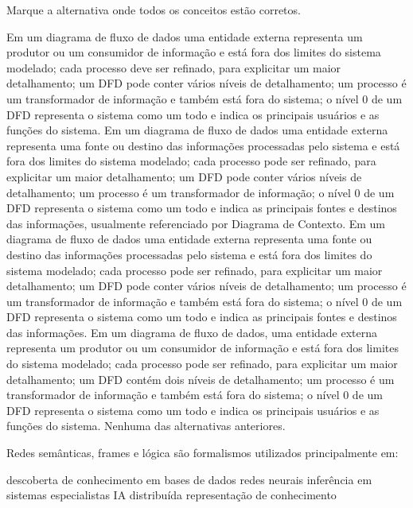\documentclass[12pt, addpoints]{exam}
\begin{document}
    \begin{questions}

    \newpage
    \question
Marque a alternativa onde todos os conceitos estão corretos.

\begin{choices}
\choice Em um diagrama de fluxo de dados uma entidade externa representa um produtor ou um consumidor de informação e está fora dos limites do sistema modelado; cada processo deve ser refinado, para explicitar um maior detalhamento; um DFD pode conter vários níveis de detalhamento; um processo é um transformador de informação e também está fora do sistema; o nível 0 de um DFD representa o sistema como um todo e indica os principais usuários e as funções do sistema.
\choice Em um diagrama de fluxo de dados uma entidade externa representa uma fonte ou destino das informações processadas pelo sistema e está fora dos limites do sistema modelado; cada processo pode ser refinado, para explicitar um maior detalhamento; um DFD pode conter vários níveis de detalhamento; um processo é um transformador de informação; o nível 0 de um DFD representa o sistema como um todo e indica as principais fontes e destinos das informações, usualmente referenciado por Diagrama de Contexto.
\choice Em um diagrama de fluxo de dados uma entidade externa representa uma fonte ou destino das informações processadas pelo sistema e está fora dos limites do sistema modelado; cada processo pode ser refinado, para explicitar um maior detalhamento; um DFD pode conter vários níveis de detalhamento; um processo é um transformador de informação e também está fora do sistema; o nível 0 de um DFD representa o sistema como um todo e indica as principais fontes e destinos das informações.
\choice Em um diagrama de fluxo de dados, uma entidade externa representa um produtor ou um consumidor de informação e está fora dos limites do sistema modelado; cada processo pode ser refinado, para explicitar um maior detalhamento; um DFD contém dois níveis de detalhamento; um processo é um transformador de informação e também está fora do sistema; o nível 0 de um DFD representa o sistema como um todo e indica os principais usuários e as funções do sistema.
\choice Nenhuma das alternativas anteriores.
\end{choices}

\question
Redes semânticas, frames e lógica são formalismos utilizados principalmente em: 
\begin{choices}
\choice descoberta de conhecimento em bases de dados
\choice redes neurais
\choice inferência em sistemas especialistas
\choice IA distribuída
\choice representação de conhecimento
\end{choices}


\end{questions}
\end{document}

